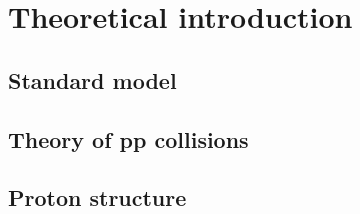 \chapter{Theoretical introduction}
\section{Standard model}
\section{Theory of pp collisions}
\section{Proton structure}

